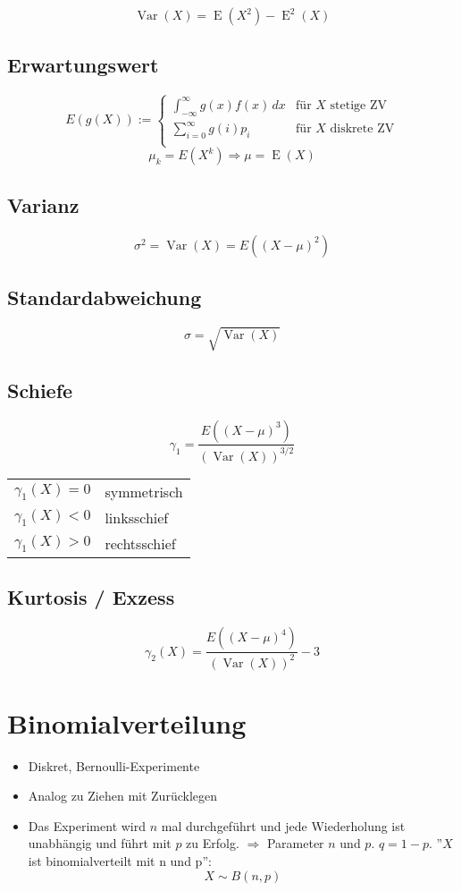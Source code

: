 \documentclass[a4paper,twocolumn]{article}
\DeclareMathOperator{\Var}{Var}
\DeclareMathOperator{\E}{E}
\begin{document}
\[
    \Var{(X)} = \E(X^2) - \E^2(X)
\]

\subsection{Erwartungswert}
\[
    E(g(X)) := \left\{\begin{array}{ll}
        \int_{-\infty}^\infty g(x) f(x)\,dx & \text{für $X$ stetige ZV} \\
        \sum_{i=0}^\infty g(i) p_i & \text{für $X$ diskrete ZV} \\
    \end{array}\right.
\] \[
    \mu_k = E(X^k) \Rightarrow \mu = \E(X)
\]

\subsection{Varianz}
\[
    \sigma^2 = \Var(X) = E((X - \mu)^2)
\]

\subsection{Standardabweichung}
\[
    \sigma = \sqrt{\Var(X)}
\]

\subsection{Schiefe}
\[
    \gamma_1 = \frac{E((X - \mu)^3)}{(\Var(X))^{3/2}}
\]
\begin{center}
  \begin{tabular}{ll}
    $\gamma_1(X) = 0$ & symmetrisch \\
    $\gamma_1(X) < 0$ & linksschief \\
    $\gamma_1(X) > 0$ & rechtsschief \\
  \end{tabular}
\end{center}

\subsection{Kurtosis / Exzess}
\[
    \gamma_2(X) = \frac{E((X - \mu)^4)}{(\Var(X))^2} - 3
\]

\section{Binomialverteilung}

\begin{itemize}
  \item Diskret, Bernoulli-Experimente
  \item Analog zu Ziehen mit Zurücklegen
  \item Das Experiment wird $n$ mal durchgeführt und jede Wiederholung ist
        unabhängig und führt mit $p$ zu Erfolg. $\Rightarrow$ Parameter $n$
        und $p$. $q = 1-p$. ''$X$ ist binomialverteilt mit n und p'':
        \[
            X \sim B(n, p)
        \]
\end{itemize}
\end{document}
